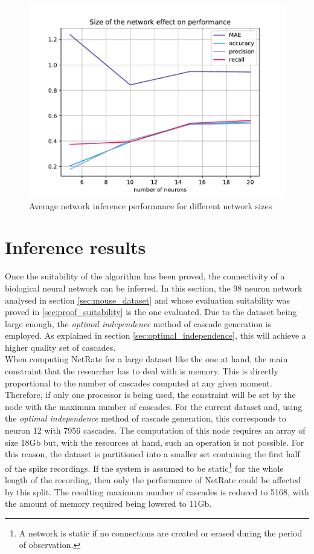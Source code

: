 \begin{figure}
	\centering
	\includegraphics[width=0.8\linewidth]{size_effect_performance.pdf}
	\caption{Average network inference performance for different network sizes}
	\label{fig:results_network_sizes}
\end{figure}

\section{Inference results}

Once the suitability of the algorithm has been proved, the connectivity of a biological neural network can be inferred. In this section, the 98 neuron network analysed in section \ref{sec:mouse_dataset} and whose evaluation suitability was proved in \ref{sec:proof_suitability} is the one evaluated. Due to the dataset being large enough, the \textit{optimal independence} method of cascade generation is employed. As explained in section \ref{sec:optimal_independence}, this will achieve a higher quality set of cascades.\\

When computing NetRate for a large dataset like the one at hand, the main constraint that the researcher has to deal with is memory. This is directly proportional to the number of cascades computed at any given moment. Therefore, if only one processor is being used, the constraint will be set by the node with the maximum number of cascades. For the current dataset and, using the \textit{optimal independence} method of cascade generation, this corresponds to neuron 12 with 7956 cascades. The computation of this node requires an array of size 18Gb but, with the resources at hand, such an operation is not possible. For this reason, the dataset is partitioned into a smaller set containing the first half of the spike recordings. If the system is assumed to be static\footnote{A network is static if no connections are created or erased during the period of observation.} for the whole length of the recording, then only the performance of NetRate could be affected by this split. The resulting maximum number of cascades is reduced to 5168, with the amount of memory required being lowered to 11Gb.\\

